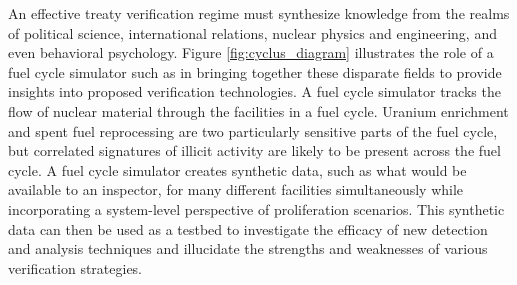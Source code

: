 An effective treaty verification regime must synthesize knowledge from the realms of political science, international relations, nuclear physics and engineering, and even behavioral psychology.  Figure \ref{fig:cyclus_diagram} illustrates  the role of a fuel cycle simulator such as \Cyclus in bringing together these disparate fields to provide insights into proposed verification technologies. A fuel cycle simulator tracks the flow of nuclear material through the facilities in a fuel cycle\cite{gidden_agent-based_2015}.  Uranium enrichment and spent fuel reprocessing are two particularly sensitive parts of the fuel cycle, but correlated signatures of illicit activity are likely to be present across the fuel cycle. A fuel cycle simulator creates synthetic data, such as what would be available to an inspector, for many different facilities simultaneously while incorporating a system-level perspective of proliferation scenarios. This synthetic data can then be used as a testbed to investigate the efficacy of new detection and analysis techniques and illucidate the strengths and weaknesses of various verification strategies.
